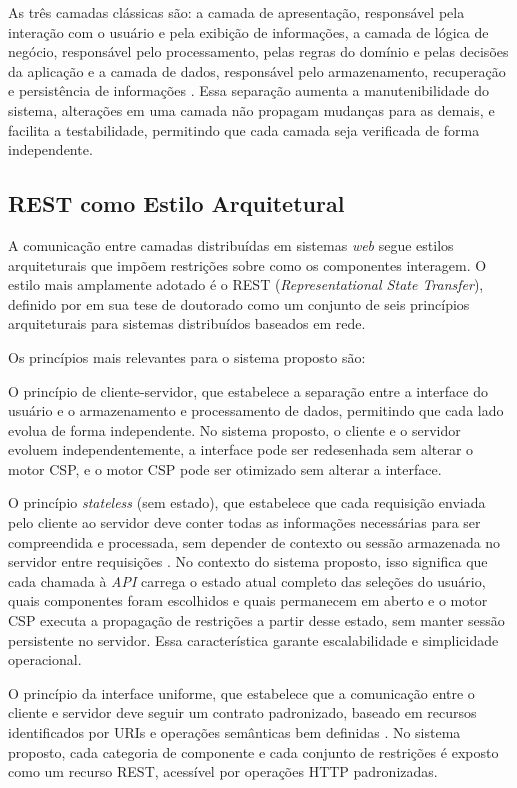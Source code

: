 As três camadas clássicas são: a camada de apresentação, responsável pela interação com o usuário e pela exibição de informações,
a camada de lógica de negócio, responsável pelo processamento, pelas regras do domínio e pelas decisões da aplicação e a camada de dados,
responsável pelo armazenamento, recuperação e persistência de informações \cite{Fowler2002}. Essa separação aumenta a manutenibilidade
do sistema, alterações em uma camada não propagam mudanças para as demais, e facilita a testabilidade, permitindo que cada camada seja
verificada de forma independente.

\subsection{REST como Estilo Arquitetural}
A comunicação entre camadas distribuídas em sistemas \textit{web} segue estilos arquiteturais que impõem restrições sobre
como os componentes interagem. O estilo mais amplamente adotado é o REST (\textit{Representational State Transfer}), definido por
\cite{Fielding2000} em sua tese de doutorado como um conjunto de seis princípios arquiteturais para sistemas distribuídos baseados
em rede.

Os princípios mais relevantes para o sistema proposto são:

O princípio de cliente-servidor, que estabelece a separação entre a interface do usuário e o armazenamento e processamento de dados,
permitindo que cada lado evolua de forma independente. No sistema proposto, o cliente e o servidor evoluem independentemente, a interface
pode ser redesenhada sem alterar o motor CSP, e o motor CSP pode ser otimizado sem alterar a interface.

O princípio \textit{stateless} (sem estado), que estabelece que cada requisição enviada pelo cliente ao servidor deve conter
todas as informações necessárias para ser compreendida e processada, sem depender de contexto ou sessão armazenada no servidor
entre requisições \cite{Fielding2000}. No contexto do sistema proposto, isso significa que cada chamada à \textit{API} carrega o
estado atual completo das seleções do usuário, quais componentes foram escolhidos e quais permanecem em aberto e o motor CSP
executa a propagação de restrições a partir desse estado, sem manter sessão persistente no servidor. Essa característica garante
escalabilidade e simplicidade operacional.

O princípio da interface uniforme, que estabelece que a comunicação entre o cliente e servidor deve seguir um contrato padronizado,
baseado em recursos identificados por URIs e operações semânticas bem definidas \cite{Richardson2007}. No sistema proposto,
cada categoria de componente e cada conjunto de restrições é exposto como um recurso REST, acessível por operações HTTP padronizadas.


